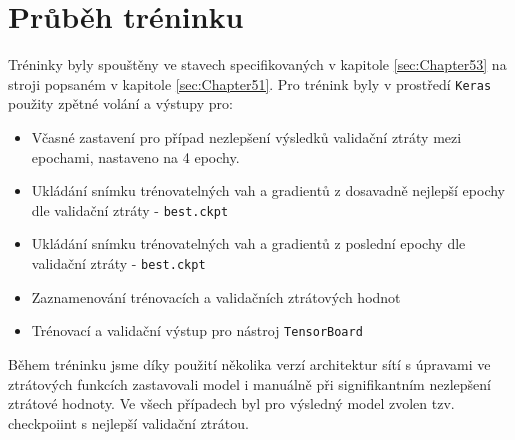 \section{Průběh tréninku}
\label{sec:Chapter54}
Tréninky byly spouštěny ve stavech specifikovaných v kapitole \ref{sec:Chapter53} na stroji popsaném v kapitole \ref{sec:Chapter51}. Pro trénink byly v prostředí \texttt{Keras} použity zpětné volání a výstupy pro:
\begin{itemize}
    \item Včasné zastavení pro případ nezlepšení výsledků validační ztráty mezi epochami, nastaveno na 4 epochy.
    \item Ukládání snímku trénovatelných vah a gradientů z dosavadně nejlepší epochy dle validační ztráty - \texttt{best.ckpt}
    \item Ukládání snímku trénovatelných vah a gradientů z poslední epochy dle validační ztráty - \texttt{best.ckpt}
    \item Zaznamenování trénovacích a validačních ztrátových hodnot
    \item Trénovací a validační výstup pro nástroj \texttt{TensorBoard}
\end{itemize}
Během tréninku jsme díky použití několika verzí architektur sítí s úpravami ve ztrátových funkcích zastavovali model i manuálně při signifikantním nezlepšení ztrátové hodnoty. Ve všech případech byl pro výsledný model zvolen tzv. checkpoiint s nejlepší validační ztrátou.
\endinput